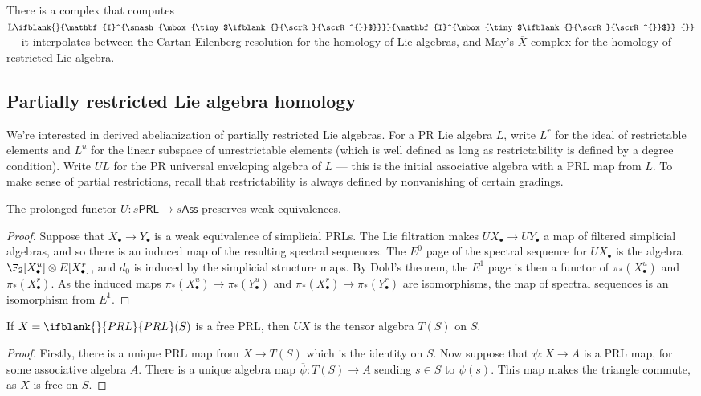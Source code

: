 \documentclass[10pt]{article}
\newcommand{\PRLie}[1]%
{\ifblank{#1}{\scrR}{\scrR^{#1}}}
\newcommand{\Ind}[2][]{\ifblank{#1}{\mathbf{I}^{\smash{\mbox{\tiny $#2$}}}}{\mathbf{I}^{\mbox{\tiny $#2$}}_{#1}}}%
\newcommand{\Fr}[2][]{\ifblank{#1}{#2}{#2_{#1}}}
\newcommand{\derived}{\mathbb{L}}
\begin{document}
\begin{DerivedFunctorsLowDimension}
There is a complex that computes $\derived\Ind{\PRLie{}}$ --- it interpolates between the Cartan-Eilenberg resolution for the homology of Lie algebras, and May's $\overline{X}$ complex for the homology of restricted Lie algebra.
\end{DerivedFunctorsLowDimension}

\begin{PRlieKoszulCxCalcOriginalWithSSeq}
\subsection{Partially restricted Lie algebra homology}
We're interested in derived abelianization of partially restricted Lie algebras. For a PR Lie algebra $L$, write $L^r$ for the ideal of restrictable elements and $L^u$ for the linear subspace of unrestrictable elements (which is well defined as long as restrictability is defined by a degree condition). Write $UL$ for the PR universal enveloping algebra of $L$ --- this is the initial associative algebra with a PRL map from $L$. To make sense of partial restrictions, recall that restrictability is always defined by nonvanishing of certain gradings.

\begin{lem}
The prolonged functor $U:s\mathsf{PRL}\to s\mathsf{Ass}$ preserves weak equivalences.
\end{lem}
\begin{proof}
Suppose that $X_\bullet\to Y_\bullet$ is a weak equivalence of simplicial PRLs. The Lie filtration makes $UX_\bullet\to UY_\bullet$ a map of filtered simplicial algebras, and so there is an induced map of the resulting spectral sequences. The $E^0$ page of the spectral sequence for $UX_\bullet$ is the algebra $\F_2[X_\bullet^u]\otimes E[X_\bullet^r]$, and $d_0$ is induced by the simplicial structure maps. By Dold's theorem, the $E^1$ page is then a functor of $\pi_*(X_\bullet^u)$ and $\pi_*(X_\bullet^r)$. As the induced maps $\pi_*(X_\bullet^u)\to\pi_*(Y_\bullet^u)$ and $\pi_*(X_\bullet^r)\to\pi_*(Y_\bullet^r)$ are isomorphisms, the map of spectral sequences is an isomorphism from $E^1$.
\end{proof}

\begin{lem}
If $X=\Fr{PRL}(S)$ is a free PRL, then $UX$ is the tensor algebra $T(S)$ on $S$.
\end{lem}
\begin{proof}
Firstly, there is a unique PRL map from $X\to T(S)$ which is the identity on $S$. Now suppose that $\psi:X\to A$ is a PRL map, for some associative algebra $A$. There is a unique algebra map $\overline{\psi}:T(S)\to A$ sending $s\in S$ to $\psi(s)$. This map makes the triangle commute, as $X$ is free on $S$.
\end{proof}


\end{PRlieKoszulCxCalcOriginalWithSSeq}
\end{document}
